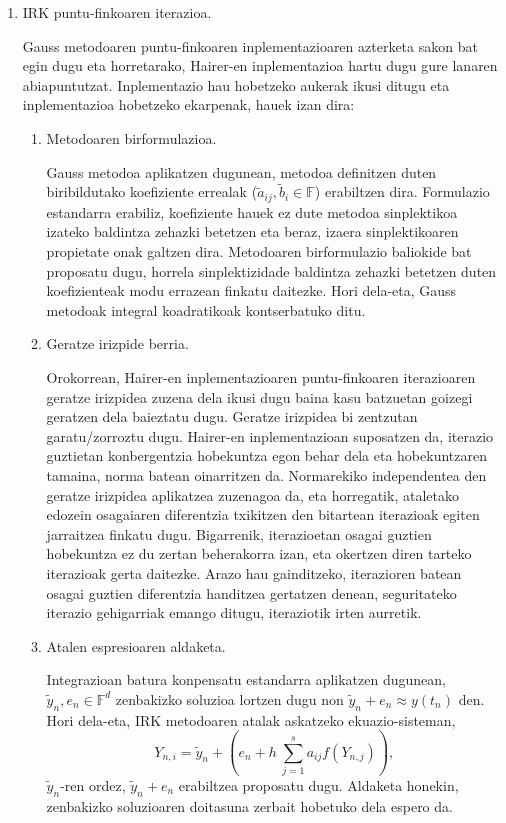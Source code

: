 \begin{enumerate}
\item IRK puntu-finkoaren iterazioa.

Gauss metodoaren puntu-finkoaren inplementazioaren azterketa sakon bat egin dugu eta horretarako, Hairer-en inplementazioa \cite{Hairer2008} hartu dugu gure lanaren abiapuntutzat. Inplementazio hau hobetzeko aukerak ikusi ditugu eta inplementazioa hobetzeko ekarpenak, hauek izan dira:  

\begin{enumerate}
\item Metodoaren birformulazioa.

Gauss metodoa aplikatzen dugunean, metodoa definitzen duten biribildutako koefiziente errealak ($\tilde{a}_{ij}, \tilde{b}_i \in \mathbb{F}$) erabiltzen dira. Formulazio estandarra erabiliz, koefiziente hauek ez dute metodoa sinplektikoa izateko baldintza zehazki betetzen eta beraz, izaera sinplektikoaren propietate onak galtzen dira. Metodoaren birformulazio baliokide bat proposatu dugu, horrela sinplektizidade baldintza zehazki betetzen duten koefizienteak modu errazean finkatu daitezke. Hori dela-eta, Gauss metodoak integral koadratikoak kontserbatuko ditu.

\item Geratze irizpide berria.

Orokorrean, Hairer-en inplementazioaren puntu-finkoaren iterazioaren geratze irizpidea zuzena dela ikusi dugu baina kasu batzuetan goizegi geratzen dela baieztatu dugu. Geratze irizpidea bi zentzutan garatu/zorroztu dugu. Hairer-en inplementazioan suposatzen da, iterazio guztietan konbergentzia hobekuntza egon behar dela eta hobekuntzaren tamaina, norma batean oinarritzen da. Normarekiko independentea den geratze irizpidea aplikatzea zuzenagoa da, eta horregatik, ataletako edozein osagaiaren diferentzia txikitzen den bitartean iterazioak egiten jarraitzea finkatu dugu. Bigarrenik, iterazioetan osagai guztien hobekuntza ez du zertan beherakorra izan, eta okertzen diren tarteko iterazioak gerta daitezke. Arazo hau gainditzeko, iterazioren batean osagai guztien diferentzia handitzea gertatzen denean, seguritateko iterazio gehigarriak emango ditugu, iteraziotik irten aurretik.   

\item Atalen espresioaren aldaketa.

Integrazioan batura konpensatu estandarra aplikatzen dugunean, $\tilde{y}_n, e_n \in \mathbb{F}^d$ zenbakizko soluzioa  lortzen dugu non $\tilde{y}_n+e_n \approx y(t_n)$ den. Hori dela-eta, IRK metodoaren atalak askatzeko ekuazio-sisteman,
\begin{equation*}
Y_{n,i}=\tilde{y}_n + \left(e_n+ h \ \sum_{j=1}^{s} a_{ij} f(Y_{n,j}) \right),
\end{equation*}
$\tilde{y}_n$-ren ordez, $\tilde{y}_n+e_n$ erabiltzea proposatu dugu. Aldaketa honekin, zenbakizko soluzioaren doitasuna zerbait hobetuko dela espero da.
 

\end{enumerate}
\end{enumerate}
